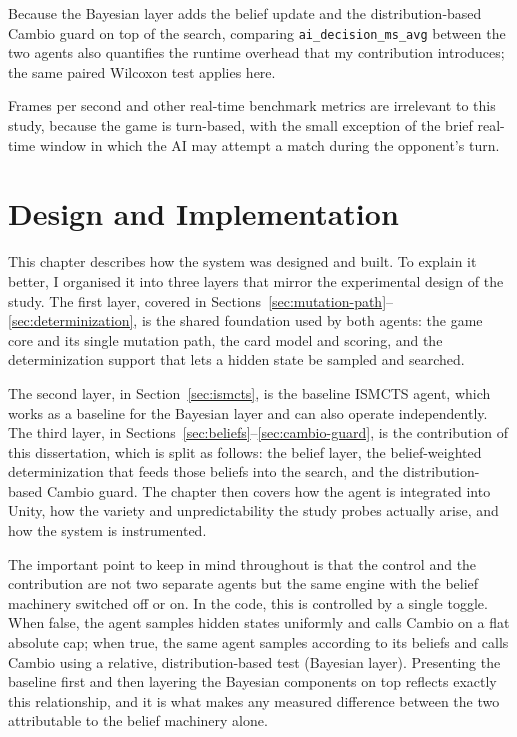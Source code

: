\documentclass[12pt,a4paper,oneside]{report}
\begin{document}
Because the Bayesian layer adds the belief update and the distribution-based Cambio
guard on top of the search, comparing \texttt{ai\_decision\_ms\_avg} between the two
agents also quantifies the runtime overhead that my contribution introduces; the
same paired Wilcoxon test applies here.

Frames per second and other real-time benchmark metrics are irrelevant to this
study, because the game is turn-based, with the small exception of the brief
real-time window in which the AI may attempt a match during the opponent's turn.

\chapter{Design and Implementation}\label{chap:design}
\label{ch:impl}

This chapter describes how the system was designed and built. To explain it better, I organised it into three layers that mirror the experimental design of the study. The first layer, covered in Sections~\ref{sec:mutation-path}--\ref{sec:determinization}, is the shared foundation used by both agents: the game core and its single mutation path, the card model and scoring, and the determinization support that lets a hidden state be sampled and searched. 

The second layer, in Section~\ref{sec:ismcts}, is the baseline ISMCTS agent, which works as a baseline for the Bayesian layer and can also operate independently. The third layer, in Sections~\ref{sec:beliefs}--\ref{sec:cambio-guard}, is the contribution of this dissertation, which is split as follows: the belief layer, the belief-weighted determinization that feeds those beliefs into the search, and the distribution-based Cambio guard. The chapter then covers how the agent is integrated into Unity, how the variety and unpredictability the study probes actually arise, and how the system is instrumented.

The important point to keep in mind throughout is that the control and the contribution are not two separate agents but the same engine with the belief machinery switched off or on. In the code, this is controlled by a single toggle. When false, the agent samples hidden states uniformly and calls Cambio on a flat absolute cap; when true, the same agent samples according to its beliefs and calls Cambio using a relative, distribution-based test (Bayesian layer). Presenting the baseline first and then layering the Bayesian components on top reflects exactly this relationship, and it is what makes any measured difference between the two attributable to the belief machinery alone.
\end{document}
